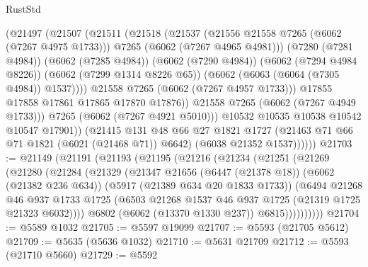 \begin{lexlean}{RustStd}
\begin{coremodule}
                      (@21497
                        (@21507
                          (@21511
                            (@21518
                              (@21537
                                (@21556 @21558 @7265 (@6062 (@7267 @4975 @1733)))
                                @7265
                                (@6062 (@7267 @4965 @4981)))
                              (@7280 (@7281 @4984))
                              (@6062 (@7285 @4984))
                              (@6062 (@7290 @4984))
                              (@6062 (@7294 @4984 @8226))
                              (@6062 (@7299 @1314 @8226 @65))
                              (@6062 (@6063 (@6064 (@7305 @4984)) @1537))))
                          @21558
                          @7265
                          (@6062 (@7267 @4957 @1733)))
                        @17855
                        @17858
                        @17861
                        @17865
                        @17870
                        @17876))
                    @21558
                    @7265
                    (@6062 (@7267 @4949 @1733)))
                  @7265
                  (@6062 (@7267 @4921 @5010)))
                @10532
                @10535
                @10538
                @10542
                @10547
                @17901))
            (@21415
              @131
              @48
              @66
              @27
              @1821
              @1727
              (@21463 @71 @66 @71 @1821 (@6021 (@21468 @71)) @6642)
              (@6038 @21352 @1537))))))
@21703 := @21149
    (@21191
      (@21193
        (@21195
          (@21216
            (@21234
              (@21251
                (@21269
                  (@21280
                    (@21284
                      (@21329
                        (@21347
                          @21656
                          (@6447 (@21378 @18))
                          (@6062 (@21382 @236 @634))
                          (@5917 (@21389 @634 @20 @1833 @1733))
                          (@6494
                            @21268
                            @46
                            @937
                            @1733
                            @1725
                            (@6503 @21268 @1537 @46 @937 @1725 (@21319 @1725 @21323 @6032))))
                        @6802
                        (@6062 (@13370 @1330 @237))
                        @6815))))))))))
@21704 := @5589 @1032
@21705 := @5597 @19099
@21707 := @5593 (@21705 @5612)
@21709 := @5635 (@5636 @1032)
@21710 := @5631 @21709
@21712 := @5593 (@21710 @5660)
@21729 := @5592

\end{coremodule}
\end{lexlean}
